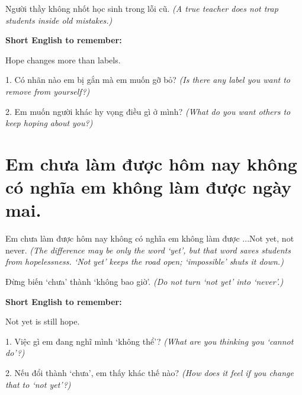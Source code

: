 \begin{baihoc}
Người thầy không nhốt học sinh trong lỗi cũ.
\textit{(A true teacher does not trap students inside old mistakes.)}
\end{baihoc}

\begin{ghinhoanh}
\textbf{Short English to remember:}

Hope changes more than labels.

\end{ghinhoanh}

\begin{tuhocnhanh}
1. Có nhãn nào em bị gắn mà em muốn gỡ bỏ? \textit{(Is there any label you want to remove from yourself?)}

2. Em muốn người khác hy vọng điều gì ở mình? \textit{(What do you want others to keep hoping about you?)}
\end{tuhocnhanh}
\ngancach


\section{Em chưa làm được hôm nay không có nghĩa em không làm được ngày mai.}
\begin{truyen}{Em chưa làm được hôm nay không có nghĩa em không làm được ...}{Not yet, not never.}
\textit{(The difference may be only the word `yet', but that word saves students from hopelessness. `Not yet' keeps the road open; `impossible' shuts it down.)}
\end{truyen}

\begin{baihoc}
Đừng biến `chưa' thành `không bao giờ'.
\textit{(Do not turn `not yet' into `never'.)}
\end{baihoc}

\begin{ghinhoanh}
\textbf{Short English to remember:}

Not yet is still hope.

\end{ghinhoanh}

\begin{tuhocnhanh}
1. Việc gì em đang nghĩ mình `không thể'? \textit{(What are you thinking you `cannot do'?)}

2. Nếu đổi thành `chưa', em thấy khác thế nào? \textit{(How does it feel if you change that to `not yet'?)}
\end{tuhocnhanh}
\ngancach


